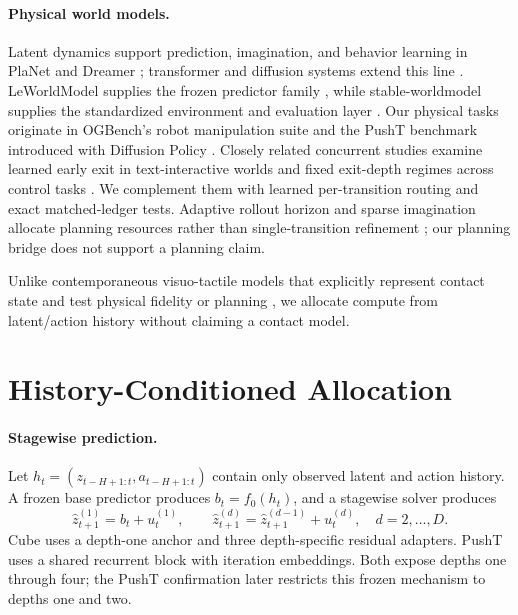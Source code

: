 \documentclass{article}
\begin{document}
\paragraph{Physical world models.}
Latent dynamics support prediction, imagination, and behavior learning in PlaNet and Dreamer \citep{hafner2019planet,hafner2020dreamer}; transformer and diffusion systems extend this line \citep{micheli2023iris,alonso2024diamond}. LeWorldModel supplies the frozen predictor family \citep{maes2026leworldmodel}, while stable-worldmodel supplies the standardized environment and evaluation layer \citep{maes2026stableworldmodel}. Our physical tasks originate in OGBench's robot manipulation suite \citep{park2025ogbench} and the PushT benchmark introduced with Diffusion Policy \citep{chi2023diffusion}. Closely related concurrent studies examine learned early exit in text-interactive worlds \citep{lu2026loopwm} and fixed exit-depth regimes across control tasks \citep{sivasankar2026adaptive}. We complement them with learned per-transition routing and exact matched-ledger tests. Adaptive rollout horizon and sparse imagination allocate planning resources rather than single-transition refinement \citep{bhatia2022adaptive,chun2026sparse}; our planning bridge does not support a planning claim.

Unlike contemporaneous visuo-tactile models that explicitly represent contact state and test physical fidelity or planning \citep{higuera2026visuotactile,ma2026feelworld}, we allocate compute from latent/action history without claiming a contact model.

\section{History-Conditioned Allocation}
\label{sec:method}

\paragraph{Stagewise prediction.}
Let \(h_t=(z_{t-H+1:t},a_{t-H+1:t})\) contain only observed latent and action history. A frozen base predictor produces \(b_t=f_0(h_t)\), and a stagewise solver produces
\begin{equation}
  \hat z^{(1)}_{t+1}=b_t+u^{(1)}_t,\qquad
  \hat z^{(d)}_{t+1}=\hat z^{(d-1)}_{t+1}+u^{(d)}_t,\quad d=2,\ldots,D .
  \label{eq:refinement}
\end{equation}
Cube uses a depth-one anchor and three depth-specific residual adapters. PushT uses a shared recurrent block with iteration embeddings. Both expose depths one through four; the PushT confirmation later restricts this frozen mechanism to depths one and two.
\end{document}

